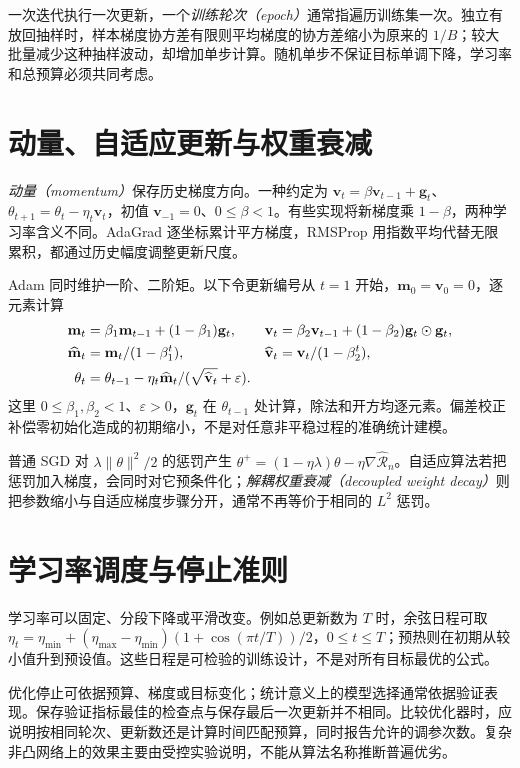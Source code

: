 一次迭代执行一次更新，一个\emph{训练轮次（epoch）}通常指遍历训练集一次。独立有放回抽样时，样本梯度协方差有限则平均梯度的协方差缩小为原来的 $1/B$；较大批量减少这种抽样波动，却增加单步计算。随机单步不保证目标单调下降，学习率和总预算必须共同考虑。

\section{动量、自适应更新与权重衰减}
\emph{动量（momentum）}保存历史梯度方向。一种约定为 $\mathbf v_t=\beta\mathbf v_{t-1}+\mathbf g_t$、$\theta_{t+1}=\theta_t-\eta_t\mathbf v_t$，初值 $\mathbf v_{-1}=0$、$0\leq\beta<1$。有些实现将新梯度乘 $1-\beta$，两种学习率含义不同。AdaGrad 逐坐标累计平方梯度，RMSProp 用指数平均代替无限累积，都通过历史幅度调整更新尺度。

Adam 同时维护一阶、二阶矩。以下令更新编号从 $t=1$ 开始，$\mathbf m_0=\mathbf v_0=0$，逐元素计算
\begin{align}
\mathbf m_t&=\beta_1\mathbf m_{t-1}+(1-\beta_1)\mathbf g_t,&
\mathbf v_t&=\beta_2\mathbf v_{t-1}+(1-\beta_2)\mathbf g_t\odot\mathbf g_t,\notag\\
\widehat{\mathbf m}_t&=\mathbf m_t/(1-\beta_1^t),&
\widehat{\mathbf v}_t&=\mathbf v_t/(1-\beta_2^t),\notag\\
\theta_t&=\theta_{t-1}-\eta_t\widehat{\mathbf m}_t/(\sqrt{\widehat{\mathbf v}_t}+\varepsilon).
\label{eq:dl-adam}
\end{align}
这里 $0\leq\beta_1,\beta_2<1$、$\varepsilon>0$，$\mathbf g_t$ 在 $\theta_{t-1}$ 处计算，除法和开方均逐元素。偏差校正补偿零初始化造成的初期缩小，不是对任意非平稳过程的准确统计建模。

普通 SGD 对 $\lambda\|\theta\|^2/2$ 的惩罚产生 $\theta^+=(1-\eta\lambda)\theta-\eta\nabla\widehat{\mathcal R}_n$。自适应算法若把惩罚加入梯度，会同时对它预条件化；\emph{解耦权重衰减（decoupled weight decay）}则把参数缩小与自适应梯度步骤分开，通常不再等价于相同的 $L^2$ 惩罚。

\section{学习率调度与停止准则}
学习率可以固定、分段下降或平滑改变。例如总更新数为 $T$ 时，余弦日程可取 $\eta_t=\eta_{\min}+(\eta_{\max}-\eta_{\min})(1+\cos(\pi t/T))/2$，$0\leq t\leq T$；预热则在初期从较小值升到预设值。这些日程是可检验的训练设计，不是对所有目标最优的公式。

优化停止可依据预算、梯度或目标变化；统计意义上的模型选择通常依据验证表现。保存验证指标最佳的检查点与保存最后一次更新并不相同。比较优化器时，应说明按相同轮次、更新数还是计算时间匹配预算，同时报告允许的调参次数。复杂非凸网络上的效果主要由受控实验说明，不能从算法名称推断普遍优劣。

